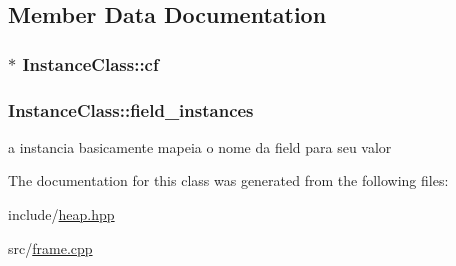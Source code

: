 \subsection{Member Data Documentation}
\hypertarget{classInstanceClass_aeb9db24db45ec79011ef631aa8d75cf4}{
\subsubsection[{cf}]{$\ast$ Instance\+Class\+::cf}}\label{classInstanceClass_aeb9db24db45ec79011ef631aa8d75cf4}
\hypertarget{classInstanceClass_a54a27ef099353666a92d3d8a6e0d65d3}{
\subsubsection[{field\+\_\+instances}]{\setlength{\rightskip}{0pt plus 5cm}Instance\+Class\+::field\+\_\+instances}}\label{classInstanceClass_a54a27ef099353666a92d3d8a6e0d65d3}


a instancia basicamente mapeia o nome da field para seu valor 



The documentation for this class was generated from the following files\+:\begin{DoxyCompactItemize}
\item 
include/\hyperlink{heap_8hpp}{heap.\+hpp}\item 
src/\hyperlink{frame_8cpp}{frame.\+cpp}\end{DoxyCompactItemize}
